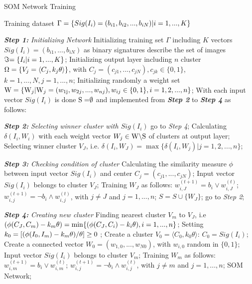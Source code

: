\documentclass{amcs}
\begin{document}
\begin{algorithm}[!ht]
\caption{SOM Network Training}
\label{alg:SOM-training}
\begin{algorithmic}[1]
\REQUIRE Training dataset $\Gamma  = {\rm{\{ }}Sig({I_i}) = ({b_{i1}},{b_{i2}},...,{b_{iN}})|i = 1,...,K{\rm{\} }}$

\textbf{\textit{Step 1: }} \textit{Initializing Network}
\STATE Initializing training set $\Gamma $ including $K$ vectors $Sig({I_i}) = ({b_{i1}},...,{b_{iN}})$ as binary signatures describe the set of images $\Im {\rm{  =  \{ }}{I_i}|i = 1,...,K\}$;
\STATE Initializing output layer including $n$ cluster $\Omega  = {\rm{\{ }}{V_j} = \langle {C_j},{k_j}\theta \rangle {\rm{\} }}$, with ${C_j} = ({c_{j1}},...,{c_{jN}}),{c_{jk}} \in \{ 0,1\} $, $k = 1,...,N,j = 1,...,n$; 
\STATE Initializing randomly a weight set ${\rm{W}} = {\rm{\{ }}{{\rm{W}}_j}|{{\rm{W}}_j} = ({w_{{\rm{1j}}}},{w_{2j}},...,{w_{nj}}),{w_{ij}} \in \{ 0,1\} ,i = 1,2,...,n\}$;
\STATE With each input vector $Sig({I_i})$ is done ${\rm{S  = }}\emptyset$ and implemented from \textit{\textbf{Step 2 }}to \textit{\textbf{Step 4}} as follows: 
		
\textbf{\textit{Step 2: }} \textit{Selecting winner cluster with $Sig({I_i})$}
\STATE go to  \textit{ Step 4};
\ELSE
\STATE Calculating $\delta ({I_i},{W_i})$ with each weight vector ${W_j} \in {\rm{W\backslash S}}$ of clusters at output layer;
\STATE Selecting winner cluster ${V_J}$, i.e. $\delta ({I_i},{W_J}) = \max \{ \delta ({I_i},{W_j})|j = 1,2,...,n\} $;
\ENDIF

\textit{\textbf{Step 3:}} \textit{Checking condition of cluster}
\STATE Calculating the similarity measure $\phi $ between input vector $Sig({I_i})$ and center ${C_j} = ({c_{j1}},...,{c_{jN}})$;
\STATE Input vector $Sig({I_i})$ belongs to cluster ${V_J}$;
\STATE Training ${W_J}$ as follows: 
	\STATE $w_{i,J}^{(t + 1)} = {b_i} \vee w_{i,J}^{(t)}$;
	\STATE $w_{i,j}^{(t + 1)} = \neg {b_i} \wedge w_{i,j}^{(t)}$, with $j \ne J$ and $j = 1,...,n$;
\ELSE
\STATE $S = S \cup \{ {W_J}\}$; go to \textit{Step 2};	
\ENDIF

\textbf{\textit{Step 4:}} \textit{Creating new cluster}
\STATE Finding nearest cluster ${V_m}$ to ${V_J}$, i.e $(\phi ({C_J},{C_m}) - {k_m}\theta ) = \min \{ (\phi ({C_J},{C_i}) - {k_i}\theta ),i = 1,...,n{\rm{\} }}$;
\STATE Setting ${k_0} = \left[ {{{(\phi ({I_0},{I_m}) - {k_m}\theta )} \mathord{\left/
 {\vphantom {{(\phi ({I_0},{I_m}) - {k_m}\theta )} \theta }} \right.
	\kern-\nulldelimiterspace} \theta }} \right] \ge 0$ ;
\STATE Create a cluster ${V_0} = \langle {C_0},{k_0}\theta \rangle$: ${C_0} = Sig({I_i})$;
\STATE Create a connected vector ${W_0} = ({w_{1,0}},...,{w_{N0}})$, with ${w_{i,0}}$ random in $\{ 0,1\} $;
\ENDIF
{} 
\STATE Input vector $Sig({I_i})$ belongs to cluster ${V_m}$; 
\STATE Training ${W_m}$ as follows:
	\STATE $w_{i,m}^{(t + 1)} = {b_i} \vee w_{i,m}^{(t)}$;
	\STATE $w_{i,j}^{(t + 1)} = \neg {b_i} \wedge w_{i,j}^{(t)}$, with $j \ne m$ and $j = 1,...,n$;
\ENDIF	
\RETURN SOM Network;
\end{algorithmic}
\end{algorithm}
\end{document}
